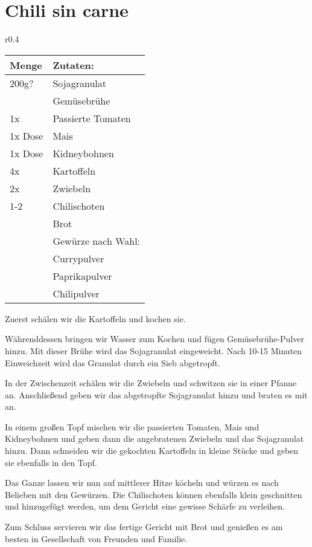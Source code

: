 \documentclass[../../book.tex]{subfiles}
\begin{document}
\section{Chili sin carne}
\begin{wraptable}{r}{0.4\textwidth}
  \centering
  \begin{tabularx}{0.39\textwidth}{|l|X|}
    \toprule
    Menge & Zutaten: \\
    \midrule
    200g? & Sojagranulat \\
    \midrule
    & Gemüsebrühe\\
    \midrule
    1x & Passierte Tomaten \\
    \midrule
    1x Dose & Mais\\
    \midrule
    1x Dose & Kidneybohnen\\
    \midrule
    4x & Kartoffeln\\
    \midrule
    2x & Zwiebeln\\
    \midrule
    1-2 & Chilischoten\\
    \midrule
    & Brot\\
    \midrule
    & Gewürze nach Wahl:\\
    & Currypulver\\
    & Paprikapulver\\
    & Chilipulver\\
    \bottomrule
  \end{tabularx}
\end{wraptable}

Zuerst schälen wir die Kartoffeln und kochen sie.

Währenddessen bringen wir Wasser zum Kochen und fügen Gemüsebrühe-Pulver hinzu. Mit dieser Brühe wird das Sojagranulat eingeweicht. Nach 10-15 Minuten Einweichzeit wird das Granulat durch ein Sieb abgetropft.

In der Zwischenzeit schälen wir die Zwiebeln und schwitzen sie in einer Pfanne an. Anschließend geben wir das abgetropfte Sojagranulat hinzu und braten es mit an.

In einem großen Topf mischen wir die passierten Tomaten, Mais und Kidneybohnen und geben dann die angebratenen Zwiebeln und das Sojagranulat hinzu. Dann schneiden wir die gekochten Kartoffeln in kleine Stücke und geben sie ebenfalls in den Topf.

Das Ganze lassen wir nun auf mittlerer Hitze köcheln und würzen es nach Belieben mit den Gewürzen. Die Chilischoten können ebenfalls klein geschnitten und hinzugefügt werden, um dem Gericht eine gewisse Schärfe zu verleihen.

Zum Schluss servieren wir das fertige Gericht mit Brot und genießen es am besten in Gesellschaft von Freunden und Familie.

\newpage
\end{document}
